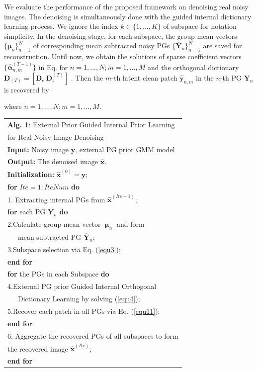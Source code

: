 \documentclass[10pt,twocolumn,letterpaper]{article}
\begin{document}
We evaluate the performance of the proposed framework on denoising real noisy images. The denoising is simultaneously done with the guided internal dictionary learning process. We ignore the index $k\in\{1,...,K\}$ of subspace for notation simplicity. In the denoising stage, for each subspace, the group mean vectors $\{\bm{\mu}_{n}\}_{n=1}^{N}$ of corresponding mean subtracted noisy PGs $\{\mathbf{\overline{Y}}_{n}\}_{n=1}^{N}$ are saved for reconstruction. Until now, we obtain the solutions of sparse coefficient vectors $\{\hat{\bm{\alpha}}_{n,m}^{(T-1)}\}$ in Eq. for $n=1,...,N;m=1,...,M$ and the orthogonal dictionary $\mathbf{D}_{(T)} = [\mathbf{D}_{e}\ \mathbf{D}_{i}^{(T)}]$ . Then the $m$-th latent clean patch $\hat{\mathbf{y}}_{n,m}$ in the $n$-th PG $\mathbf{Y}_{n}$ is recovered by 

where $n=1,...,N;m=1,...,M$.
\begin{table}\label{alg1}
\begin{tabular}{l}
\hline
\textbf{Alg. 1}: External Prior Guided Internal Prior Learning
\\
\quad \quad \quad for Real Noisy Image Denoising
\\
\hline
\textbf{Input:} Noisy image $\mathbf{y}$, external PG prior GMM model
\\
\textbf{Output:} The denoised image $\hat{\mathbf{x}}$.
\\
\textbf{Initialization:} $\hat{\mathbf{x}}^{(0)}=\mathbf{y}$;
\\
\textbf{for} $Ite = 1:IteNum$ \textbf{do}
\\
1. Extracting internal PGs from $\hat{\mathbf{x}}^{(Ite-1)}$;
\\
\quad\textbf{for} each PG $\mathbf{Y}_{n}$ \textbf{do}
\\
2.\quad Calculate group mean vector $\boldsymbol{\upmu}_{n}$ and form 
\\
\quad \ \ \ mean subtracted PG $\mathbf{\overline{Y}}_{n}$;
\\
3.\quad Subspace selection via Eq. (\ref{equ3});
\\
\quad\textbf{end for}
\\
\quad\textbf{for} the PGs in each Subspace \textbf{do}
\\
4.\quad External PG prior Guided Internal Orthogonal
\\
\quad \ \ \ Dictionary Learning by solving (\ref{equ4});
\\
5.\quad Recover each patch in all PGs via Eq. (\ref{equ11});
\\
\quad\textbf{end for}
\\
6. Aggregate the recovered PGs of all subspaces to form
\\
\quad the recovered image $\hat{\mathbf{x}}^{(Ite)}$;
\\
\textbf{end for}
\\
\hline
\end{tabular}
\end{table}
\end{document}
